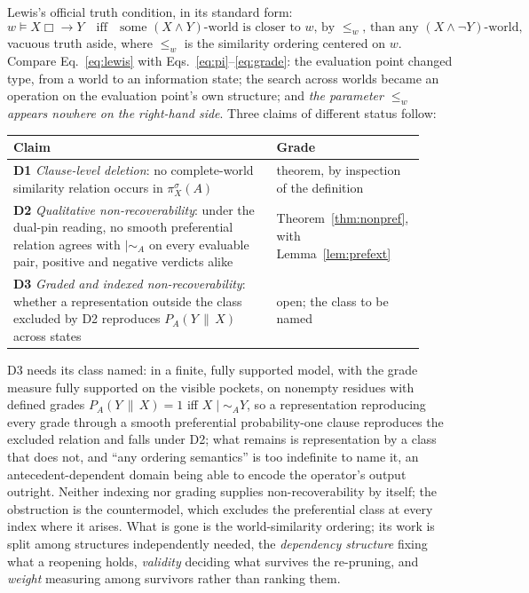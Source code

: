 Lewis's official truth condition, in its standard form:
\begin{equation}\label{eq:lewis}
w \models X \mathrel{\Box\!\!\rightarrow} Y \quad \text{iff} \quad \text{some } (X \wedge Y)\text{-world is closer to } w \text{, by } \leq_w \text{, than any } (X \wedge \neg Y)\text{-world},
\end{equation}
vacuous truth aside, where $\leq_w$ is the similarity ordering centered on $w$. Compare Eq.~\eqref{eq:lewis} with Eqs.~\eqref{eq:pi}--\eqref{eq:grade}: the evaluation point changed type, from a world to an information state; the search across worlds became an operation on the evaluation point's own structure; and \emph{the parameter $\leq_w$ appears nowhere on the right-hand side}. Three claims of different status follow:
\begin{center}
\begin{tabular}{p{0.62\linewidth} p{0.3\linewidth}}
\toprule
\textbf{Claim} & \textbf{Grade} \\
\midrule
\textbf{D1} \emph{Clause-level deletion}: no complete-world similarity relation occurs in $\pi^{\sigma}_X(A)$ & theorem, by inspection of the definition \\
\textbf{D2} \emph{Qualitative non-recoverability}: under the dual-pin reading, no smooth preferential relation agrees with $\mid\sim_A$ on every evaluable pair, positive and negative verdicts alike & Theorem~\ref{thm:nonpref}, with Lemma~\ref{lem:prefext} \\
\textbf{D3} \emph{Graded and indexed non-recoverability}: whether a representation outside the class excluded by D2 reproduces $P_A(Y\,\|\,X)$ across states & open; the class to be named \\
\bottomrule
\end{tabular}
\end{center}
\noindent D3 needs its class named: in a finite, fully supported model, with the grade measure fully supported on the visible pockets, on nonempty residues with defined grades $P_A(Y\,\|\,X) = 1$ iff $X \mid\sim_A Y$, so a representation reproducing every grade through a smooth preferential probability-one clause reproduces the excluded relation and falls under D2; what remains is representation by a class that does not, and ``any ordering semantics'' is too indefinite to name it, an antecedent-dependent domain being able to encode the operator's output outright. Neither indexing nor grading supplies non-recoverability by itself; the obstruction is the countermodel, which excludes the preferential class at every index where it arises. What is gone is the world-similarity ordering; its work is split among structures independently needed, the \emph{dependency structure} fixing what a reopening holds, \emph{validity} deciding what survives the re-pruning, and \emph{weight} measuring among survivors rather than ranking them.

